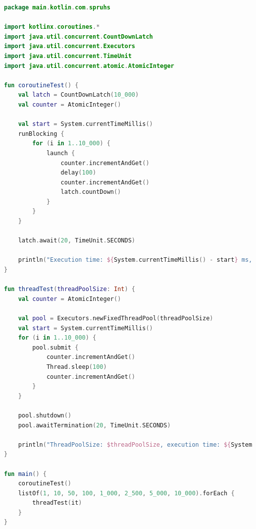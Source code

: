 \documentclass[11pt]{article}
\begin{document}
    \begin{lstlisting}[language=Kotlin, caption={Coroutines.kt}, label={lst:kotlin-coroutine}]
package main.kotlin.com.spruhs

import kotlinx.coroutines.*
import java.util.concurrent.CountDownLatch
import java.util.concurrent.Executors
import java.util.concurrent.TimeUnit
import java.util.concurrent.atomic.AtomicInteger

fun coroutineTest() {
    val latch = CountDownLatch(10_000)
    val counter = AtomicInteger()

    val start = System.currentTimeMillis()
    runBlocking {
        for (i in 1..10_000) {
            launch {
                counter.incrementAndGet()
                delay(100)
                counter.incrementAndGet()
                latch.countDown()
            }
        }
    }

    latch.await(20, TimeUnit.SECONDS)

    println("Execution time: ${System.currentTimeMillis() - start} ms, Counter: ${counter.get()/2}")
}

fun threadTest(threadPoolSize: Int) {
    val counter = AtomicInteger()

    val pool = Executors.newFixedThreadPool(threadPoolSize)
    val start = System.currentTimeMillis()
    for (i in 1..10_000) {
        pool.submit {
            counter.incrementAndGet()
            Thread.sleep(100)
            counter.incrementAndGet()
        }
    }

    pool.shutdown()
    pool.awaitTermination(20, TimeUnit.SECONDS)

    println("ThreadPoolSize: $threadPoolSize, execution time: ${System.currentTimeMillis() - start} ms, Counter: ${counter.get()/2}")
}

fun main() {
    coroutineTest()
    listOf(1, 10, 50, 100, 1_000, 2_500, 5_000, 10_000).forEach {
        threadTest(it)
    }
}
    \end{lstlisting}
\end{document}
